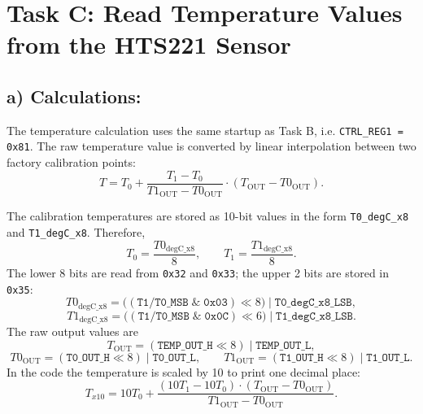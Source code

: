 
\section{Task C: Read Temperature Values from the HTS221 Sensor}

\subsection{a) Calculations:}

The temperature calculation uses the same startup as Task B, i.e. \texttt{CTRL\_REG1 = 0x81}. The raw temperature value is converted by linear interpolation between two factory calibration points:
\[
	T = T_0 + \frac{T_1 - T_0}{T1_{\mathrm{OUT}} - T0_{\mathrm{OUT}}}\cdot\left(T_{\mathrm{OUT}} - T0_{\mathrm{OUT}}\right).
\]

The calibration temperatures are stored as 10-bit values in the form \texttt{T0\_degC\_x8} and \texttt{T1\_degC\_x8}. Therefore,
\[
	T_0 = \frac{T0_{\mathrm{degC\_x8}}}{8}, \qquad T_1 = \frac{T1_{\mathrm{degC\_x8}}}{8}.
\]
The lower 8 bits are read from \texttt{0x32} and \texttt{0x33}; the upper 2 bits are stored in \texttt{0x35}:
\[
	T0_{\mathrm{degC\_x8}} = \bigl((\texttt{T1/T0\_MSB} \;\&\; \texttt{0x03}) \ll 8\bigr)\;|\;\texttt{T0\_degC\_x8\_LSB},
\]
\[
	T1_{\mathrm{degC\_x8}} = \bigl((\texttt{T1/T0\_MSB} \;\&\; \texttt{0x0C}) \ll 6\bigr)\;|\;\texttt{T1\_degC\_x8\_LSB}.
\]
The raw output values are
\[
	T_{\mathrm{OUT}} = (\texttt{TEMP\_OUT\_H} \ll 8)\;|\;\texttt{TEMP\_OUT\_L},
\]
\[
	T0_{\mathrm{OUT}} = (\texttt{T0\_OUT\_H} \ll 8)\;|\;\texttt{T0\_OUT\_L}, \qquad
	T1_{\mathrm{OUT}} = (\texttt{T1\_OUT\_H} \ll 8)\;|\;\texttt{T1\_OUT\_L}.
\]
In the code the temperature is scaled by 10 to print one decimal place:
\[
	T_{x10} = 10T_0 + \frac{(10T_1 - 10T_0)\cdot(T_{\mathrm{OUT}} - T0_{\mathrm{OUT}})}{T1_{\mathrm{OUT}} - T0_{\mathrm{OUT}}}.
\]

